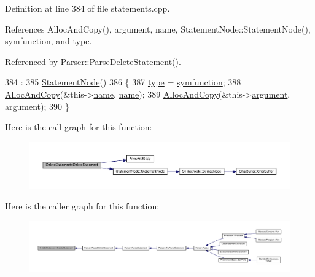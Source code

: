 Definition at line 384 of file statements.\+cpp.



References Alloc\+And\+Copy(), argument, name, Statement\+Node\+::\+Statement\+Node(), symfunction, and type.



Referenced by Parser\+::\+Parse\+Delete\+Statement().


\begin{DoxyCode}
384                                                                        :
385     \hyperlink{classStatementNode_a586026d6009a39d087792d621de86360}{StatementNode}()
386 \{
387     \hyperlink{classDeleteStatement_a46629e67cd652c61ccabfc79c4cc8e01}{type} = \hyperlink{lex_8h_a7feef761cd73fac6e25b8bb80d2c4e54ac0ac9c237f5df41937de351d33daeef4}{symfunction};
388     \hyperlink{clib_8h_a5bed05c70cb17e541fee570b5dc32e1a}{AllocAndCopy}(&this->\hyperlink{classDeleteStatement_aec9706bae02a354afec8f639e283e5b9}{name}, \hyperlink{classDeleteStatement_aec9706bae02a354afec8f639e283e5b9}{name});
389     \hyperlink{clib_8h_a5bed05c70cb17e541fee570b5dc32e1a}{AllocAndCopy}(&this->\hyperlink{classDeleteStatement_a0fe7f24dcfd05e0f7f449e19aaabee2d}{argument}, \hyperlink{classDeleteStatement_a0fe7f24dcfd05e0f7f449e19aaabee2d}{argument});
390 \}
\end{DoxyCode}


Here is the call graph for this function\+:
\nopagebreak
\begin{figure}[H]
\begin{center}
\leavevmode
\includegraphics[width=350pt]{db/dda/classDeleteStatement_ae742b66f6a74b0420e8ee54c8bc4a980_cgraph}
\end{center}
\end{figure}




Here is the caller graph for this function\+:
\nopagebreak
\begin{figure}[H]
\begin{center}
\leavevmode
\includegraphics[width=350pt]{db/dda/classDeleteStatement_ae742b66f6a74b0420e8ee54c8bc4a980_icgraph}
\end{center}
\end{figure}


